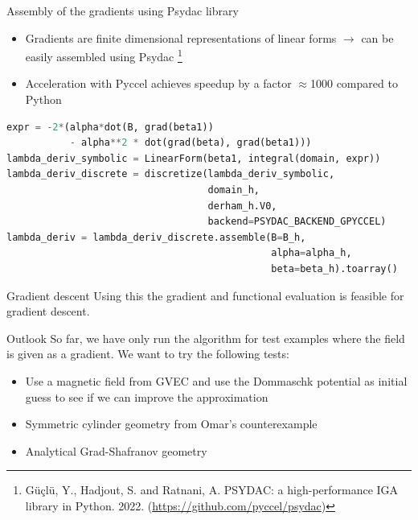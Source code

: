 \documentclass[
	english,%
	logo=false,%
	eurofusion=false, %
	titlegraphic=true, %
	]{ippbeamer}
\begin{document}
\begin{frame}[fragile]{Assembly of the gradients using Psydac library}
	\begin{itemize}
		\item Gradients are finite dimensional representations of 
			linear forms $\rightarrow$ can be easily assembled using Psydac
			\footnote{Güçlü, Y., Hadjout, S. and Ratnani, A. PSYDAC: a high-performance IGA library in Python. 2022.
			(\url{https://github.com/pyccel/psydac})} 
			
		\item  Acceleration with Pyccel achieves speedup by a factor $\approx$1000
			compared to Python
	\end{itemize}
	\begin{lstlisting}[language=Python]
expr = -2*(alpha*dot(B, grad(beta1)) 
           - alpha**2 * dot(grad(beta), grad(beta1)))
lambda_deriv_symbolic = LinearForm(beta1, integral(domain, expr))
lambda_deriv_discrete = discretize(lambda_deriv_symbolic, 
                                   domain_h, 
                                   derham_h.V0, 
                                   backend=PSYDAC_BACKEND_GPYCCEL)
lambda_deriv = lambda_deriv_discrete.assemble(B=B_h, 
                                              alpha=alpha_h, 
                                              beta=beta_h).toarray()	
	\end{lstlisting}

\end{frame}
\begin{frame}{Gradient descent}
	Using this the gradient and functional evaluation 
	is feasible for gradient descent.

	\begin{exampleblock}{Outlook}
		So far, we have only run the algorithm for test examples where the field is 
		given as a gradient. We want to try the following tests:
		\begin{itemize}
			\item Use a magnetic field from GVEC and use the Dommaschk potential 
					as initial guess to see if we can improve the
					approximation
			\item Symmetric cylinder geometry from Omar's counterexample
			\item Analytical Grad-Shafranov geometry
		\end{itemize}
	\end{exampleblock}
\end{frame}
\end{document}
